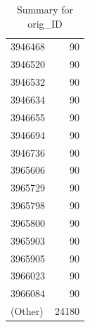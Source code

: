\begin{table}[ht]
\begin{tabular}{lr}
  3946468 &  90 \\ 
  3946520 &  90 \\ 
  3946532 &  90 \\ 
  3946634 &  90 \\ 
  3946655 &  90 \\ 
  3946694 &  90 \\ 
  3946736 &  90 \\ 
  3965606 &  90 \\ 
  3965729 &  90 \\ 
  3965798 &  90 \\ 
  3965800 &  90 \\ 
  3965903 &  90 \\ 
  3965905 &  90 \\ 
  3966023 &  90 \\ 
  3966084 &  90 \\ 
  (Other) & 24180 \\ 
   \hline
\end{tabular}
\caption{Summary for orig_ID} 
\label{tab: orig_ID}
\end{table}
